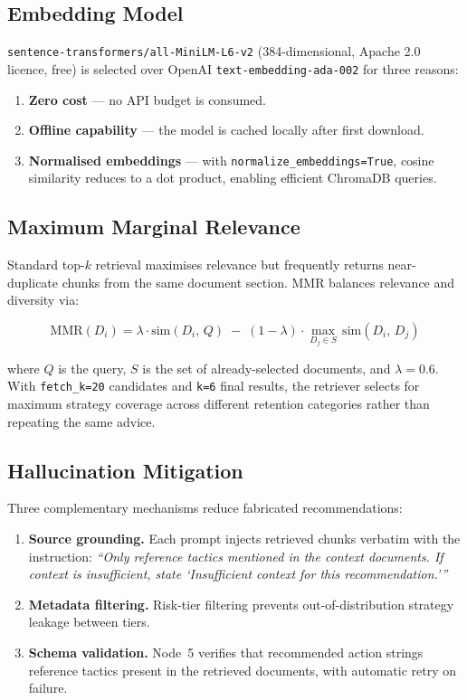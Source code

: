 \documentclass[11pt]{article}
\begin{document}
\subsection{Embedding Model}

\texttt{sentence-transformers/all-MiniLM-L6-v2} (384-dimensional, Apache
2.0 licence, free) is selected over OpenAI \texttt{text-embedding-ada-002}
for three reasons:

\begin{enumerate}
  \item \textbf{Zero cost} --- no API budget is consumed.
  \item \textbf{Offline capability} --- the model is cached locally after
        first download.
  \item \textbf{Normalised embeddings} --- with
        \texttt{normalize\_embeddings=True}, cosine similarity reduces to a
        dot product, enabling efficient ChromaDB queries.
\end{enumerate}

\subsection{Maximum Marginal Relevance}

Standard top-$k$ retrieval maximises relevance but frequently returns
near-duplicate chunks from the same document section. MMR
\cite{carbonell1998mmr} balances relevance and diversity via:

\begin{equation}
\text{MMR}(D_i) =
  \lambda \cdot \mathrm{sim}(D_i,\, Q)
  \;-\;
  (1 - \lambda) \cdot \max_{D_j \in S}\, \mathrm{sim}(D_i,\, D_j)
\label{eq:mmr}
\end{equation}

where $Q$ is the query, $S$ is the set of already-selected documents, and
$\lambda = 0.6$. With \texttt{fetch\_k=20} candidates and \texttt{k=6} final
results, the retriever selects for maximum strategy coverage across different
retention categories rather than repeating the same advice.

\subsection{Hallucination Mitigation}

Three complementary mechanisms reduce fabricated recommendations:

\begin{enumerate}
  \item \textbf{Source grounding.} Each prompt injects retrieved chunks
        verbatim with the instruction: \textit{``Only reference tactics
        mentioned in the context documents. If context is insufficient,
        state `Insufficient context for this recommendation.'\thinspace''}
  \item \textbf{Metadata filtering.} Risk-tier filtering prevents
        out-of-distribution strategy leakage between tiers.
  \item \textbf{Schema validation.} Node~5 verifies that recommended
        action strings reference tactics present in the retrieved documents,
        with automatic retry on failure.
\end{enumerate}
\end{document}
